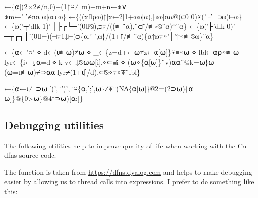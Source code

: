 \documentclass{article}%
\begin{document}
\nwenddocs{}\endmoddef\nwstartdeflinemarkup{}\nwenddeflinemarkup
{}←\{⍺[(2×2≠/n,0)+(1↑⍨≢m)+m+n←⌽∨\\⌽m←' '≠⍺⍺ ⍵]⍵⍵ ⍵\}
←\{((x⌷⍴⍵)↑[x←2|1+⍵⍵]⍺),[⍵⍵]⍺⍺@(⊂0 0)⍣('┌'=⊃⍵)⊢⍵\}
←\{⍵('┬'dlk 1)' │├┌└─'(0⌷⍉),⊃⍪/((≢¨⍺),¨⊂⌈/≢∘⍉¨⍺)↑¨⍺\}
←\{⍵('├'dlk 0)' ─┬┌┐│'(0⌷⊢)(⊣⍪1↓⊢)⊃\{⍺,' ',⍵\}/(1+⌈/≢¨⍺)\{⍺↑⍵⍪⍨'│'↑⍨≢⍉⍵\}¨⍺\}

←\{⍺←'○' ⋄ d←(⍳≢⍵)≠⍵ ⋄ _←\{z⊣d+←⍵≠z←⍺[⍵]\}⍣≡⍨⍵ ⋄ lbl←⍺⍴⍨≢⍵
        lyr←\{i←⍸⍺=d ⋄ k v←↓⍉⍵⍵[i],∘⊂⌸i ⋄ (⍵∘\{⍺[⍵]\}¨v)⍺⍺¨@k⊢⍵\}⍵
        (⍵=⍳≢⍵)⌿⊃⍺⍺ lyr⌿(1+⍳⌈/d),⊂⍉∘⍪∘⍕¨lbl\}

←\{⍺←⍳≢⊃⍵
        '(',¨')',¨⍨\{⍺,';',⍵\}⌿⍕¨(N∆\{⍺[⍵]\}@2⊢(2⊃⍵)\{⍺[|⍵]\}@\{0>⍵\}@4↑⊃⍵)[⍺;]\}
\eatline
{}\nwendcode{}\nwdocspar
\subsection{Debugging utilities}

The following utilities help to improve quality of life when working
with the Co-dfns source code.

The {\Tt{}\nwendquote} function is taken from \url{https://dfns.dyalog.com}
and helps to make debugging easier by allowing us to thread
{\Tt{}\nwendquote} calls into expressions. I prefer to do something like
this:
\end{document}
